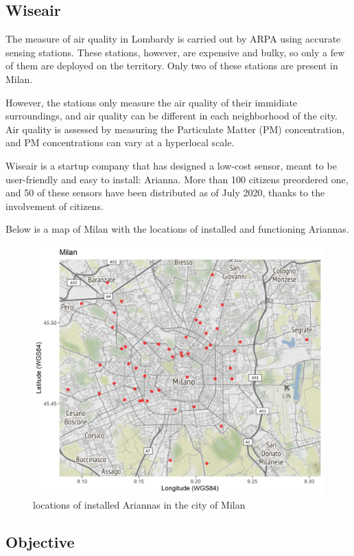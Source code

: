 \documentclass{article}
\begin{document}
\subsection{Wiseair}

The measure of air quality in Lombardy is carried out by ARPA using accurate sensing stations. These stations, however,
 are expensive and bulky, so only a few of them are deployed on the territory. Only two of these stations are present in Milan. 


However, the stations only measure the air quality of their immidiate surroundings, and air quality  can be different in each neighborhood
 of the city. Air quality is assessed by measuring the Particulate Matter (PM) concentration, and PM concentrations can vary at a hyperlocal scale.

Wiseair is a startup company that has designed a low-cost sensor, meant to be user-friendly and easy to install: Arianna.
 More than 100 citizens preordered one, and 50 of these sensors have been distributed as of July 2020, thanks to the involvement of citizens.

 Below is a map of Milan with the locations of installed and functioning Ariannas.

\begin{figure}[h!]
  \centering
  \includegraphics[width=5in]{potsMap.jpg}
  \caption{locations of installed Ariannas in the city of Milan}
\end{figure}

\subsection{Objective}
\end{document}
